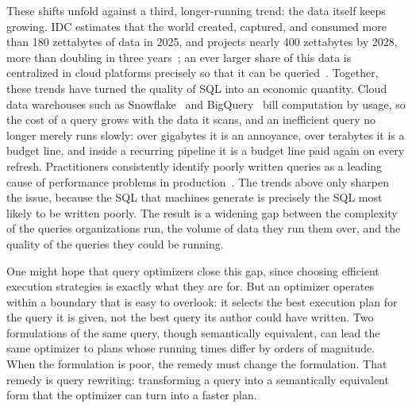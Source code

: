 These shifts unfold against a third, longer-running trend: the data
itself keeps growing. IDC estimates that the world created, captured,
and consumed more than 180 zettabytes of data in 2025, and projects
nearly 400 zettabytes by 2028, more than doubling in three
years~\cite{idcDataSphere2025}; an ever larger share of this data is
centralized in cloud platforms precisely so that it can be
queried~\cite{reinsel2018digitization}. Together, these trends have
turned the quality of SQL into an economic quantity. Cloud data
warehouses such as Snowflake~\cite{dageville2016snowflake} and
BigQuery~\cite{fernandes2015bigquery} bill computation by usage, so
the cost of a query grows with the data it scans, and an inefficient
query no longer merely runs slowly: over gigabytes it is an annoyance,
over terabytes it is a budget line, and inside a recurring pipeline it
is a budget line paid again on every refresh. Practitioners
consistently identify poorly written queries as a leading cause of
performance problems in
production~\cite{slow-query-impact-1,slow-query-impact-2,slow-query-impact-5}.
The trends above only sharpen the issue, because the SQL that machines
generate is precisely the SQL most likely to be written poorly. The
result is a widening gap between the complexity of the queries
organizations run, the volume of data they run them over, and the
quality of the queries they could be running.



One might hope that query optimizers close this gap, since choosing
efficient execution strategies is exactly what they are for. But an optimizer operates within a boundary that is easy to overlook:
it selects the best execution plan for the query it is given, not the
best query its author could have written. Two formulations of the same
query, though semantically equivalent, can lead the same optimizer to
plans whose running times differ by orders of magnitude. When the
formulation is poor, the remedy must change the formulation. That
remedy is query rewriting: transforming a query into a semantically
equivalent form that the optimizer can turn into a faster plan.

